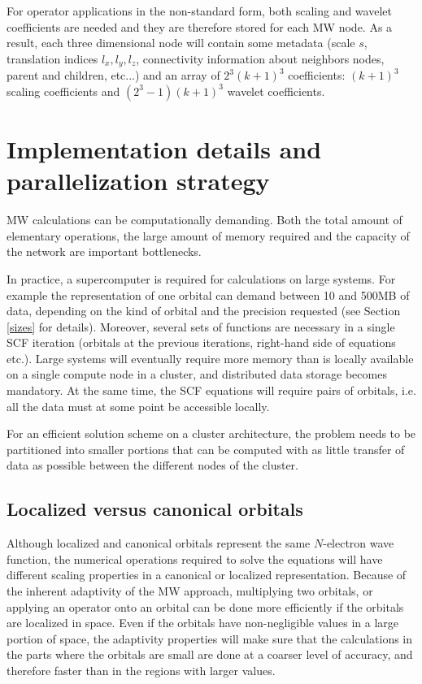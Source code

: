 \documentclass[journal=jctcce, manuscript=article]{achemso}
\begin{document}
For operator applications in the non-standard form\cite{Beylkin.10.1002/cpa.3160440202,Frediani.10.1080/00268976.2013.810793}, both scaling and wavelet coefficients are needed and they are therefore stored for each \ac{MW} node. As a result, each three dimensional node will contain some metadata (scale $s$, translation indices $l_x, l_y, l_z$, connectivity information about neighbors nodes, parent and children, etc...) and an array of $2^3 (k+1)^3$ coefficients: $(k+1)^3$ scaling coefficients and $(2^3-1)(k+1)^3$ wavelet coefficients. 

\section{Implementation details and parallelization strategy}

\ac{MW} calculations can be computationally demanding. Both the total amount of elementary operations, the large amount of memory required and the capacity of the network are important bottlenecks. 

In practice, a supercomputer is required for calculations on large systems.
For example the representation of one orbital can demand between 10 and 500MB of data, depending on the kind of orbital and the precision requested (see Section \ref{sizes} for details). Moreover, several sets of functions are necessary in a single \ac{SCF} iteration (orbitals at the previous iterations, right-hand side of equations etc.). Large systems will eventually require more memory than is locally available on a single compute node in a cluster, and distributed data storage becomes mandatory. At the same time, the \ac{SCF} equations will require pairs of orbitals, i.e. all the data must at some point be accessible locally.

For an efficient solution scheme on a cluster architecture, the problem needs to be partitioned into smaller portions that can be computed with as little transfer of data as possible between the different nodes of the cluster.

\subsection{Localized versus canonical orbitals}

Although localized and canonical orbitals represent the same $N$-electron wave function, the numerical operations required to solve the equations will have different scaling properties in a canonical or localized representation.
Because of the inherent adaptivity of the \ac{MW} approach, multiplying two orbitals, or applying an operator onto an orbital can be done more efficiently if the orbitals are localized in space. Even if the orbitals have non-negligible values in a large portion of space, the adaptivity properties will make sure that the calculations in the parts where the orbitals are small are done at a coarser level of accuracy, and therefore faster than in the regions with larger values.
\end{document}
